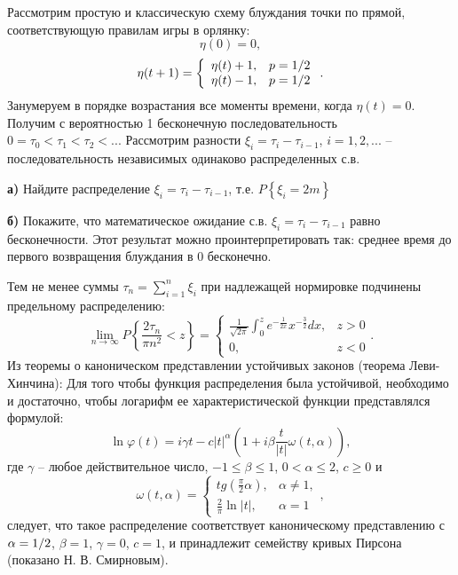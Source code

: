 \begin{problem}

Рассмотрим простую и классическую схему блуждания точки по прямой, соответствующую правилам игры в орлянку:
\[\eta (0)=0,\] 
\[\eta (t+1)=\left\{\begin{array}{cc} {\eta (t)+1,} & {p={1\mathord{\left/ {\vphantom {1 2}} \right. \kern-\nulldelimiterspace} 2} } \\ {\eta (t)-1,} & {p={1\mathord{\left/ {\vphantom {1 2}} \right. \kern-\nulldelimiterspace} 2} } \end{array}\right. .\] 
Занумеруем в порядке возрастания все моменты времени, когда $\eta (t)=0$. Получим с вероятностью 1 бесконечную последовательность $0=\tau _{0} <\tau _{1} <\tau _{2} <...$ Рассмотрим разности $\xi _{i} =\tau _{i} -\tau _{i-1} $, $i=1,2,...$ -- последовательность независимых одинаково распределенных с.в.

\textbf{а)} Найдите распределение $\xi _{i} =\tau _{i} -\tau _{i-1} $, т.е. $P\left\{\xi _{i} =2m\right\}$

\textbf{б)} Покажите, что математическое ожидание с.в. $\xi _{i} =\tau _{i} -\tau _{i-1} $ равно бесконечности. Этот результат можно проинтерпретировать так: среднее время до первого возвращения блуждания в 0 бесконечно.

Тем не менее суммы $\tau _{n} =\sum _{i=1}^{n}\xi _{i}  $ при надлежащей нормировке подчинены предельному распределению: 
\[\mathop{\lim }\limits_{n\to \infty } P\left\{\frac{2\tau _{n} }{\pi n^{2} } <z\right\}=\left\{\begin{array}{cc} {\frac{1}{\sqrt{2\pi } } \int _{0}^{z}e^{-\frac{1}{2x} } x^{-\frac{3}{2} }  dx,} & {z>0} \\ {0,} & {z<0} \end{array}\right. .\] 
Из теоремы о каноническом представлении устойчивых законов (теорема Леви-Хинчина): Для того чтобы функция распределения была устойчивой, необходимо и достаточно, чтобы логарифм ее характеристической функции представлялся формулой:
\[\ln \varphi (t)=i\gamma t-c|t|^{\alpha } \left(1+i\beta \frac{t}{|t|} \omega (t,\alpha )\right),\] 
где $\gamma $ -- любое действительное число, $-1\le \beta \le 1$, $0<\alpha \le 2$, $c\ge 0$ и
\[\omega (t,\alpha )=\left\{\begin{array}{cc} {tg\left(\frac{\pi }{2} \alpha \right),} & {\alpha \ne 1,} \\ {\frac{2}{\pi } \ln |t|,} & {\alpha =1} \end{array}\right. ,\] 
следует, что такое распределение соответствует каноническому представлению с $\alpha ={1\mathord{\left/ {\vphantom {1 2}} \right. \kern-\nulldelimiterspace} 2} $, $\beta =1$, $\gamma =0$, $c=1$, и принадлежит семейству кривых Пирсона (показано Н. В. Смирновым).

\end{problem}

